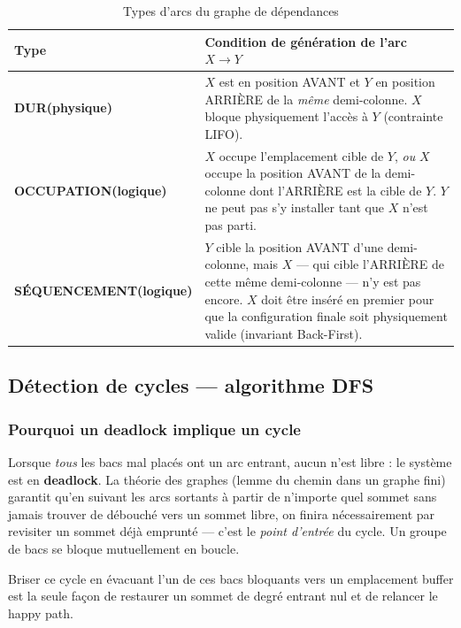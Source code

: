 \documentclass[12pt,a4paper]{article}
\begin{document}
\begin{table}[H]
\centering
\renewcommand{\arraystretch}{1.35}
\begin{tabular}{>{\bfseries}p{3.2cm} p{10.5cm}}
\toprule
Type & Condition de génération de l'arc $X \to Y$ \\
\midrule
DUR\newline(physique) &
  $X$ est en position AVANT et $Y$ en position ARRIÈRE de la
  \emph{même} demi-colonne. $X$ bloque physiquement l'accès à $Y$
  (contrainte LIFO). \\
\addlinespace
OCCUPATION\newline(logique) &
  $X$ occupe l'emplacement cible de $Y$, \emph{ou} $X$ occupe la
  position AVANT de la demi-colonne dont l'ARRIÈRE est la cible de $Y$.
  $Y$ ne peut pas s'y installer tant que $X$ n'est pas parti. \\
\addlinespace
SÉQUENCEMENT\newline(logique) &
  $Y$ cible la position AVANT d'une demi-colonne, mais $X$ — qui cible
  l'ARRIÈRE de cette même demi-colonne — n'y est pas encore. $X$ doit
  être inséré en premier pour que la configuration finale soit
  physiquement valide (invariant Back-First). \\
\bottomrule
\end{tabular}
\caption{Types d'arcs du graphe de dépendances}
\end{table}

\subsection{Détection de cycles — algorithme DFS}

\subsubsection{Pourquoi un deadlock implique un cycle}

Lorsque \emph{tous} les bacs mal placés ont un arc entrant, aucun n'est
libre : le système est en \textbf{deadlock}. La théorie des graphes
(lemme du chemin dans un graphe fini) garantit qu'en suivant les arcs
sortants à partir de n'importe quel sommet sans jamais trouver de
débouché vers un sommet libre, on finira nécessairement par revisiter
un sommet déjà emprunté — c'est le \emph{point d'entrée} du cycle. Un groupe de bacs se bloque mutuellement en boucle.

Briser ce cycle en évacuant l'un de ces bacs bloquants vers un emplacement buffer est
la seule façon de restaurer un sommet de degré entrant nul et de relancer
le happy path.
\end{document}
